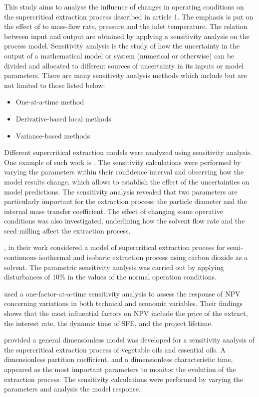 \documentclass[../Article_Model_Parameters.tex]{subfiles}
\begin{document}
	
	This study aims to analyse the influence of changes in operating conditions on the supercritical extraction process described in {\color{red}article 1}. The emphasis is put on the effect of to mass-flow rate, pressure and the inlet temperature. The relation between input and output are obtained by applying a sensitivity analysis on the process model. Sensitivity analysis is the study of how the uncertainty in the output of a mathematical model or system (numerical or otherwise) can be divided and allocated to different sources of uncertainty in its inputs or model parameters. There are many sensitivity analysis methods which include but are not limited to those listed below:
	
	\begin{itemize}
		\item One-at-a-time method
		\item Derivative-based local methods
		\item Variance-based methods
	\end{itemize}
	
	Different supercritical extraction models were analyzed using sensitivity analysis. One example of such work is \citet{Fiori_2007}. The sensitivity calculations were performed by varying the parameters within their confidence interval and observing how the model results change, which allows to establish the effect of the uncertainties on model predictions. The sensitivity analysis revealed that two parameters are particularly important for the extraction process: the particle diameter and the internal mass transfer coefficient. The effect of changing some operative conditions was also investigated, underlining how the solvent flow rate and the seed milling affect the extraction process.
	
	\citet{Santos2000}, in their work considered a model of supercritical extraction process for semi-continuous isothermal and isobaric extraction process using carbon dioxide as a solvent. The parametric sensitivity analysis was carried out by applying disturbances of 10\% in the values of the normal operation conditions.
	
	\citet{Hatami2024} used a one-factor-at-a-time sensitivity analysis to assess the response of NPV concerning variations in both technical and economic variables. Their findings shows that the most influential factors on NPV include the price of the extract, the interest rate, the dynamic time of SFE, and the project lifetime.
	
	\citet{Poletto1996} provided a general dimensionless model was developed for a sensitivity analysis of the supercritical extraction process of vegetable oils and essential oils. A dimensionless partition coefficient, and a dimensionless characteristic time, appeared as the most important parameters to monitor the evolution of the extraction process. The sensitivity calculations were performed by varying the parameters and analysis the model response.
	
\end{document}
